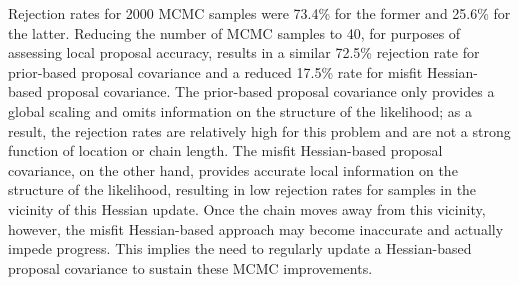 Rejection rates for 2000 MCMC samples were 73.4\% for the former and
25.6\% for the latter.  Reducing the number of MCMC samples to 40, for
purposes of assessing local proposal accuracy, results in a similar
72.5\% rejection rate for prior-based proposal covariance and a
reduced 17.5\% rate for misfit Hessian-based proposal covariance.  The
prior-based proposal covariance only provides a global scaling and
omits information on the structure of the likelihood; as a result, the
rejection rates are relatively high for this problem and are not a
strong function of location or chain length.  The misfit Hessian-based
proposal covariance, on the other hand, provides accurate local
information on the structure of the likelihood, resulting in low
rejection rates for samples in the vicinity of this Hessian update.
Once the chain moves away from this vicinity, however, the misfit
Hessian-based approach may become inaccurate and actually impede
progress. This implies the need to regularly update a Hessian-based
proposal covariance to sustain these MCMC improvements.

